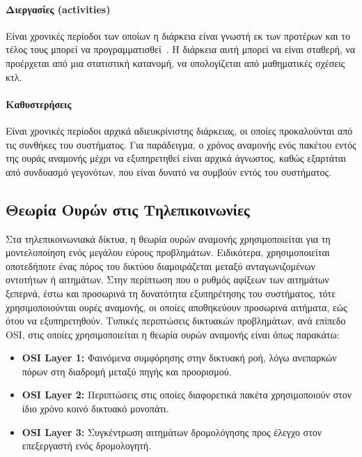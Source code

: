 \documentclass[12pt]{report}
\begin{document}
\paragraph{Διεργασίες (\textlatin{activities})} Είναι χρονικές περίοδοι των οποίων η διάρκεια είναι γνωστή εκ των προτέρων και το τέλος τους μπορεί να προγραμματισθεί~\cite{book:04}. Η διάρκεια αυτή μπορεί να είναι σταθερή, να προέρχεται από μια στατιστική κατανομή, να υπολογίζεται από μαθηματικές σχέσεις κτλ.

\paragraph{Καθυστερήσεις} Είναι χρονικές περίοδοι αρχικά αδιευκρίνιστης διάρκειας, οι οποίες προκαλούνται από τις συνθήκες του συστήματος. Για παράδειγμα, ο χρόνος αναμονής ενός πακέτου εντός της ουράς αναμονής μέχρι να εξυπηρετηθεί είναι αρχικά άγνωστος, καθώς εξαρτάται από συνδυασμό γεγονότων, που είναι δυνατό να συμβούν εντός του συστήματος.

\subsection{Θεωρία Ουρών στις Τηλεπικοινωνίες}\label{queues}
Στα τηλεπικοινωνιακά δίκτυα, η θεωρία ουρών αναμονής χρησιμοποιείται για τη μοντελοποίηση ενός μεγάλου εύρους προβλημάτων. Ειδικότερα, χρησιμοποιείται οποτεδήποτε ένας πόρος του δικτύου διαμοιράζεται μεταξύ ανταγωνιζομένων οντοτήτων ή αιτημάτων. Στην περίπτωση που ο ρυθμός αφίξεων των αιτημάτων ξεπερνά, έστω και προσωρινά τη δυνατότητα εξυπηρέτησης του συστήματος, τότε χρησιμοποιούνται ουρές αναμονής, οι οποίες αποθηκεύουν προσωρινά αιτήματα, εώς ότου να εξυπηρετηθούν. Τυπικές περιπτώσεις δικτυακών προβλημάτων, ανά επίπεδο \textlatin{OSI}, στις οποίες χρησιμοποιείται η θεωρία ουρών αναμονής είναι όπως παρακάτω:

\begin{itemize}
  \item \textbf{\textlatin{OSI Layer 1:}} Φαινόμενα συμφόρησης στην δικτυακή ροή, λόγω ανεπαρκών πόρων στη διαδρομή μεταξύ πηγής και προορισμού.
  \item \textbf{\textlatin{OSI Layer 2:}} Περιπτώσεις στις οποίες διαφορετικά πακέτα χρησιμοποιούν στον ίδιο χρόνο κοινό δικτυακό μονοπάτι.
  \item \textbf{\textlatin{OSI Layer 3:}} Συγκέντρωση αιτημάτων δρομολόγησης προς έλεγχο στον επεξεργαστή ενός δρομολογητή.
\end{itemize}
\end{document}

